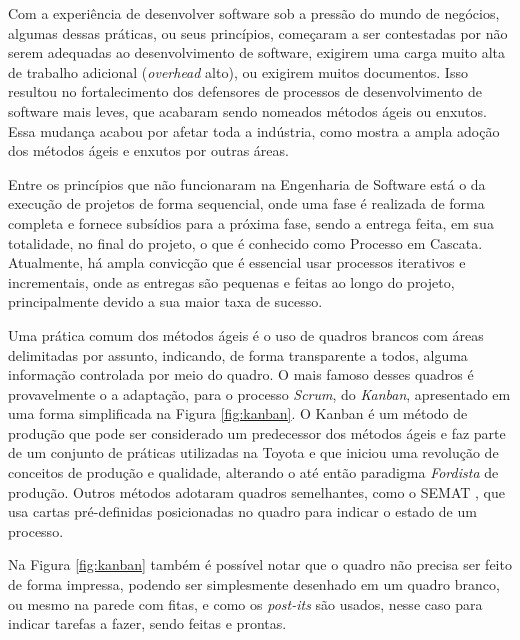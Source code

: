\documentclass[a4]{report}
\begin{document}
Com a experiência de desenvolver software sob a pressão do mundo de negócios, algumas dessas práticas, ou seus princípios,  começaram a ser contestadas por não serem adequadas ao desenvolvimento de software, exigirem uma carga muito alta de trabalho adicional (\textit{overhead} alto), ou exigirem muitos documentos. Isso resultou no fortalecimento dos defensores de processos de desenvolvimento de software mais leves, que acabaram sendo nomeados métodos ágeis ou enxutos. Essa mudança acabou por afetar toda a indústria, como mostra a ampla adoção dos métodos ágeis e enxutos por outras áreas.

Entre os princípios que não funcionaram na Engenharia de Software está o da execução de projetos de forma sequencial, onde uma fase é realizada de forma completa e fornece subsídios para a próxima fase, sendo a entrega feita, em sua totalidade, no final do projeto, o que é conhecido como Processo em Cascata. Atualmente, há ampla convicção que é essencial usar processos iterativos e incrementais, onde as entregas são pequenas e feitas ao longo do projeto, principalmente devido a sua maior taxa de sucesso\citep{pressman:2019,chaos:2015}.

Uma prática comum dos métodos ágeis é o uso de quadros brancos com áreas delimitadas por assunto, indicando, de forma transparente a todos, alguma informação controlada  por meio do quadro. O mais famoso desses quadros é provavelmente o a adaptação, para o processo \textit{Scrum}\citep{scrum:sbok:guide}, do \textit{Kanban}, apresentado em uma forma simplificada na Figura \ref{fig:kanban}. O Kanban é um método de produção que pode ser considerado um predecessor dos métodos ágeis e faz  parte de um conjunto de práticas utilizadas na Toyota e que iniciou uma revolução de conceitos de produção e qualidade, alterando o até então paradigma \textit{Fordista} de produção\citep{gross:2003:kanban}. Outros métodos adotaram quadros semelhantes, como o SEMAT \citep{jacobson_essentials_2019}, que usa cartas pré-definidas posicionadas no quadro para indicar o estado de um processo.

Na Figura \ref{fig:kanban} também é possível notar que o quadro não precisa ser feito de forma impressa, podendo ser simplesmente desenhado em um quadro branco, ou mesmo na parede com fitas, e como os \textit{post-its} são usados, nesse caso para indicar tarefas a fazer, sendo feitas e prontas.
\end{document}
